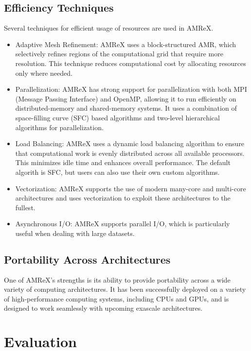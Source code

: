 \documentclass[12pt, a4paper]{scrartcl}
\begin{document}
\subsection{Efficiency Techniques}

Several techniques for efficient usage of resources are used in AMReX.

\begin{itemize}
    \item Adaptive Mesh Refinement: AMReX uses a block-structured AMR, which selectively 
    refines regions of the computational grid that require more resolution.
    This technique reduces computational cost by allocating resources only where needed.
    \item Parallelization: AMReX has strong support for parallelization with both MPI (Message Passing Interface) 
    and OpenMP, allowing it to run efficiently on distributed-memory and shared-memory systems. 
    It uses a combination of space-filling curve (SFC) based algorithms and two-level hierarchical 
    algorithms for parallelization.
    \item Load Balancing: AMReX uses a dynamic load balancing algorithm to ensure that computational 
    work is evenly distributed across all available processors. This minimizes idle time and enhances 
    overall performance. The default algorith is SFC, but users can also use their own custom algorithms.
    \item Vectorization: AMReX supports the use of modern many-core and multi-core architectures 
    and uses vectorization to exploit these architectures to the fullest.
    \item Asynchronous I/O: AMReX supports parallel I/O, which is particularly useful when dealing with large datasets.
\end{itemize}

\subsection{Portability Across Architectures}

One of AMReX's strengths is its ability to provide portability across a wide variety 
of computing architectures. It has been successfully deployed on a variety of high-performance 
computing systems, including CPUs and GPUs, and is designed to work seamlessly 
with upcoming exascale architectures.

\section{Evaluation}
\end{document}
